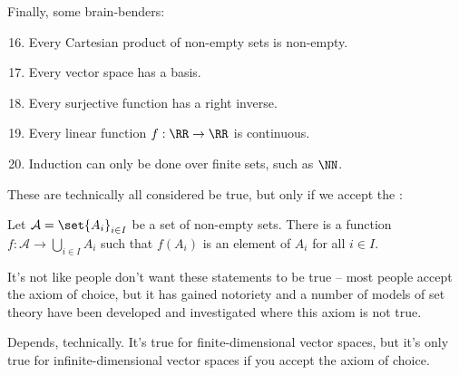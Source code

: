 \documentclass[12pt]{article}
\begin{document}
Finally, some brain-benders:  
\begin{enumerate}
  \setcounter{enumi}{15}
  \item Every Cartesian product of non-empty sets is non-empty. 
    
  \item Every vector space has a basis.

  \item Every surjective function has a right inverse. 

  \item Every linear function $f : \RR \to \RR$ is continuous. 

  \item Induction can only be done over finite sets, such as $\NN$. 
\end{enumerate}
These are technically all considered be true, but only if we
accept the : 
\begin{theorem}
  Let $\mathcal A = \set{A_i}_{i \in I}$ be a set of non-empty sets. There
    is a function $f : \mathcal A \to \bigcup_{i \in I} A_i$ such that $f(A_i)$
   is an element of $A_i$ for all $i \in I$.  
\end{theorem}
It's not like people don't want these statements to be true -- most
people accept the axiom of choice, but it has gained notoriety and a number of
models of set theory have been developed and investigated where this axiom is not true. 

Depends, technically. It's true for finite-dimensional vector spaces,
  but it's only true for infinite-dimensional vector spaces if you accept the
  axiom of choice. 

\end{document}
